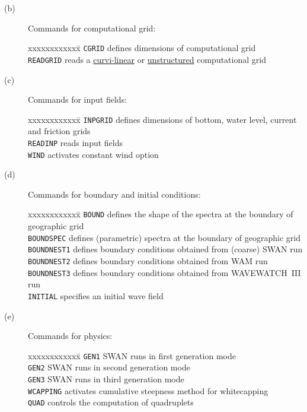 \documentclass[12pt]{book}
\begin{document}
\begin{description}
  \item[(b)] Commands for computational grid:
\begin{tabbing}
xxxxxxxxxxxx\= \kill
{\tt CGRID}    \> defines dimensions of computational grid\\
{\tt READGRID} \> reads a \underline{curvi-linear} or \underline{unstructured} computational grid\\
\end{tabbing}
  \item[(c)] Commands for input fields:
\begin{tabbing}
xxxxxxxxxxxx\= \kill
{\tt INPGRID} \> defines dimensions of bottom, water level, current and friction grids\\
{\tt READINP} \> reads input fields\\
{\tt WIND}    \> activates constant wind option\\
\end{tabbing}
  \item[(d)] Commands for boundary and initial conditions:
\begin{tabbing}
xxxxxxxxxxxx\= \kill
{\tt BOUND}      \> defines the shape of the spectra at the boundary of geographic grid\\
{\tt BOUNDSPEC}  \> defines (parametric) spectra at the boundary of geographic grid\\
{\tt BOUNDNEST1} \> defines boundary conditions obtained from (coarse) SWAN run\\
{\tt BOUNDNEST2} \> defines boundary conditions obtained from WAM run\\
{\tt BOUNDNEST3} \> defines boundary conditions obtained from WAVEWATCH~III run\\
{\tt INITIAL}    \> specifies an initial wave field\\
\end{tabbing}
  \item[(e)] Commands for physics:
\begin{tabbing}
xxxxxxxxxxxx\= \kill
{\tt GEN1}     \> SWAN runs in first generation mode\\
{\tt GEN2}     \> SWAN runs in second generation mode\\
{\tt GEN3}     \> SWAN runs in third generation mode\\
{\tt WCAPPING} \> activates cumulative steepness method for whitecapping\\
{\tt QUAD}     \> controls the computation of quadruplets\\

\end{tabbing}
\end{description}
\end{document}

